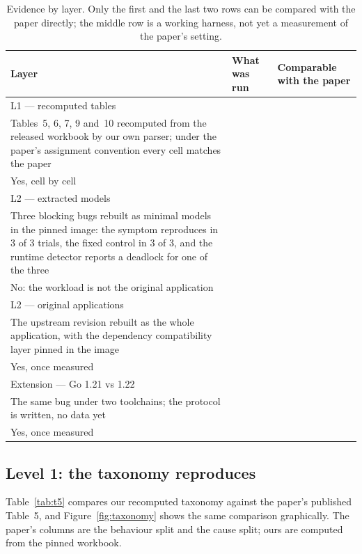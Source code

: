 \documentclass[11pt]{article}
\begin{document}
\begin{table}[h]
\centering
\caption{Evidence by layer. Only the first and the last two rows can be
compared with the paper directly; the middle row is a working harness, not
yet a measurement of the paper's setting.}
\label{tab:layers}
\begin{tabular}{@{}p{}p{}p{}@{}}
\toprule
Layer & What was run & Comparable with the paper \\
\midrule
L1 --- recomputed tables \\
Tables~5, 6, 7, 9 and~10 recomputed from the released workbook by our own
parser; under the paper's assignment convention every cell matches the paper\\
Yes, cell by cell \\
\addlinespace
L2 --- extracted models \\
Three blocking bugs rebuilt as minimal models in the pinned image: the symptom
reproduces in 3 of 3 trials, the fixed control in 3 of 3, and the runtime
detector reports a deadlock for one of the three \\
No: the workload is not the original application \\
\addlinespace
L2 --- original applications \\
The upstream revision rebuilt as the whole application, with the dependency
compatibility layer pinned in the image \\
Yes, once measured \\
\addlinespace
Extension --- Go 1.21 vs 1.22 \\
The same bug under two toolchains; the protocol is written, no data yet \\
Yes, once measured \\
\bottomrule
\end{tabular}
\end{table}


\subsection{Level 1: the taxonomy reproduces}

Table~\ref{tab:t5} compares our recomputed taxonomy against the paper's
published Table~5, and Figure~\ref{fig:taxonomy} shows the same comparison
graphically. The paper's columns are the behaviour split and the cause
split; ours are computed from the pinned workbook.
\end{document}
